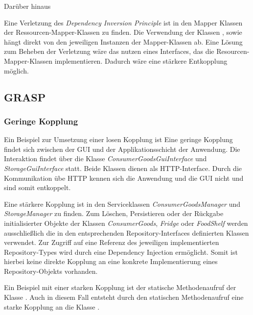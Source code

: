 Darüber hinaus 

Eine Verletzung des \textit{Dependency Inversion Principle} ist in den Mapper Klassen der Ressourcen-Mapper-Klassen zu finden. Die Verwendung der Klassen ,  sowie  hängt direkt von den jeweiligen Instanzen der Mapper-Klassen ab.
Eine Lösung zum Beheben der Verletzung wäre das nutzen eines Interfaces, das die Resourcen-Mapper-Klassen implementieren.
Dadurch wäre eine stärkere Entkopplung möglich.

\subsection{\ac{GRASP}}

\subsubsection*{Geringe Kopplung}
Ein Beispiel zur Umsetzung einer losen Kopplung ist 
Eine geringe Kopplung findet sich zwischen der \ac{GUI} und der Applikationsschicht der Anwendung.
Die Interaktion findet über die Klasse \textit{ConsumerGoodsGuiInterface} und \textit{StorageGuiInterface} statt.
Beide Klassen dienen als \ac{HTTP}-Interface.
Durch die Kommunikation übe \ac{HTTP} kennen sich die Anwendung und die \ac{GUI} nicht und sind somit entkoppelt.

Eine stärkere Kopplung ist in den Serviceklassen \textit{ConsumerGoodsManager} und \textit{StorageManager} zu finden.
Zum Löschen, Persistieren oder der Rückgabe initialisierter Objekte der Klassen \textit{ConsumerGoods}, \textit{Fridge} oder \textit{FoodShelf} werden ausschließlich die in den entsprechenden Repository-Interfaces definierten Klassen verwendet.
Zur Zugriff auf eine Referenz des jeweiligen implementierten Repository-Types wird durch eine Dependency Injection ermöglicht.
Somit ist hierbei keine direkte Kopplung an eine konkrete Implementierung eines Repository-Objekts vorhanden.

Ein Beispiel mit einer starken Kopplung ist der statische Methodenaufruf  der Klasse .
Auch in diesem Fall entsteht durch den statischen Methodenaufruf eine starke Kopplung an die Klasse .

